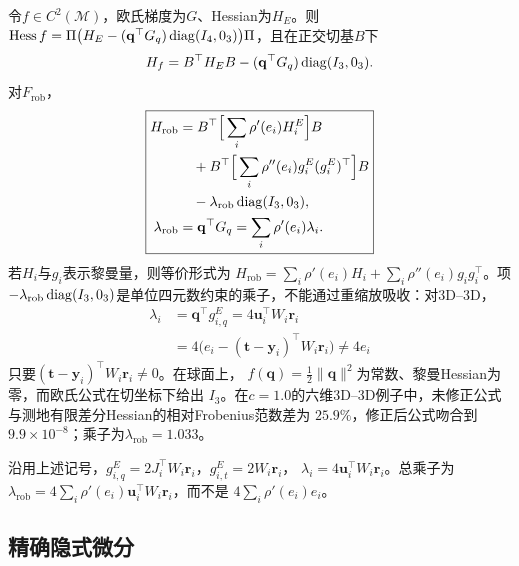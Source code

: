 \begin{lemma}\label{lem:hessian}
令$f\in C^2(\mathcal{M})$，欧氏梯度为$G$、Hessian为$H_E$。则
$\operatorname{Hess}f=\Pi\big(H_E-(\mathbf{q}^\top G_q)\operatorname{diag}(I_4,0_3)\big)\Pi$，且在正交切基$B$下
\begin{equation}
H_f=B^\top H_E B-(\mathbf{q}^\top G_q)\operatorname{diag}(I_3,0_3).
\end{equation}
对$F_{\mathrm{rob}}$，
\begin{equation}
\boxed{
\begin{aligned}
H_{\mathrm{rob}}&=B^\top\Big[\sum_i\rho'(e_i)H_i^E\Big]B\\
&\quad+B^\top\Big[\sum_i\rho''(e_i)g_i^E(g_i^E)^\top\Big]B\\
&\quad-\lambda_{\mathrm{rob}}\operatorname{diag}(I_3,0_3),\\
\lambda_{\mathrm{rob}}&=\mathbf{q}^\top G_q=\sum_i\rho'(e_i)\lambda_i .
\end{aligned}}
\end{equation}
若$H_i$与$g_i$表示黎曼量，则等价形式为
$H_{\mathrm{rob}}=\sum_i\rho'(e_i)H_i+\sum_i\rho''(e_i)g_ig_i^\top$。项
$-\lambda_{\mathrm{rob}}\operatorname{diag}(I_3,0_3)$是单位四元数约束的乘子，不能通过重缩放吸收：对3D--3D，
\begin{equation}
\begin{aligned}
\lambda_i&=\mathbf{q}^\top g_{i,q}^E=4\mathbf{u}_i^\top W_i\mathbf{r}_i\\
&=4\big(e_i-(\mathbf{t}-\mathbf{y}_i)^\top W_i\mathbf{r}_i\big)\neq4e_i
\end{aligned}
\end{equation}
只要$(\mathbf{t}-\mathbf{y}_i)^\top W_i\mathbf{r}_i\neq0$。在球面上，
$f(\mathbf{q})=\frac12\|\mathbf{q}\|^2$为常数、黎曼Hessian为零，而欧氏公式在切坐标下给出
$I_3$。在$c=1.0$的六维3D--3D例子中，未修正公式与测地有限差分Hessian的相对Frobenius范数差为
$25.9\%$，修正后公式吻合到$9.9\times10^{-8}$；乘子为$\lambda_{\mathrm{rob}}=1.033$。
\end{lemma}

\begin{lemma}[3D--3D权重]\label{lem:weights}
沿用上述记号，$g_{i,q}^E=2J_i^\top W_i\mathbf{r}_i$，$g_{i,t}^E=2W_i\mathbf{r}_i$，
$\lambda_i=4\mathbf{u}_i^\top W_i\mathbf{r}_i$。总乘子为
$\lambda_{\mathrm{rob}}=4\sum_i\rho'(e_i)\mathbf{u}_i^\top W_i\mathbf{r}_i$，而不是
$4\sum_i\rho'(e_i)e_i$。
\end{lemma}

\subsection{精确隐式微分}

